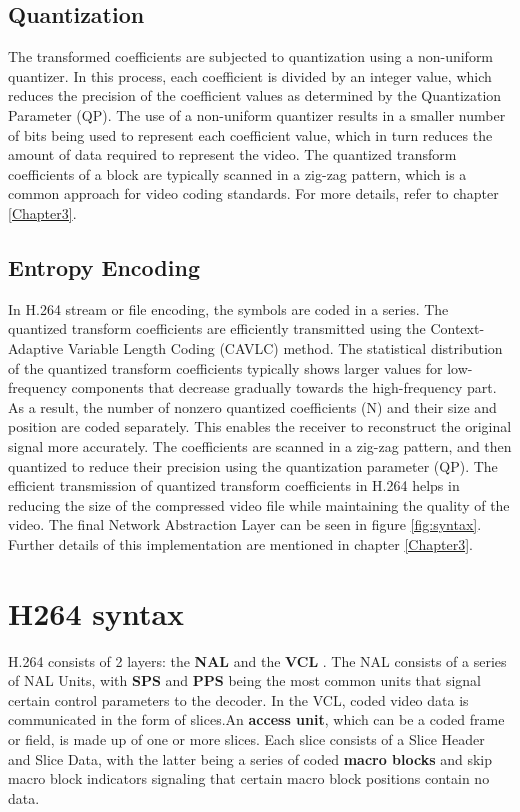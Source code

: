 \subsection{Quantization}
The transformed coefficients are subjected to quantization using a non-uniform quantizer. In this process, each coefficient is divided by an integer value, which reduces the precision of the coefficient values as determined by the Quantization Parameter (QP). The use of a non-uniform quantizer results in a smaller number of bits being used to represent each coefficient value, which in turn reduces the amount of data required to represent the video. The quantized transform coefficients of a block are typically scanned in a zig-zag pattern, which is a common approach for video coding standards. For more details, refer to chapter \ref{Chapter3}.


\subsection{Entropy Encoding}
In H.264 stream or file encoding, the symbols are coded in a series. The quantized transform coefficients are efficiently transmitted using the Context-Adaptive Variable Length Coding (CAVLC) method. The statistical distribution of the quantized transform coefficients typically shows larger values for low-frequency components that decrease gradually towards the high-frequency part. As a result, the number of nonzero quantized coefficients (N) and their size and position are coded separately. This enables the receiver to reconstruct the original signal more accurately. The coefficients are scanned in a zig-zag pattern, and then quantized to reduce their precision using the quantization parameter (QP). The efficient transmission of quantized transform coefficients in H.264 helps in reducing the size of the compressed video file while maintaining the quality of the video. The final Network Abstraction Layer can be seen in figure \ref{fig:syntax}. Further details of this implementation are mentioned in chapter \ref{Chapter3}.


\section{H264 syntax}
H.264 consists of 2 layers: the \textbf{NAL} and the \textbf{VCL} \cite{richardson2010h264}. The NAL consists of a series of NAL Units, with \textbf{SPS} and \textbf{PPS} being the most common units that signal certain control parameters to the decoder. In the VCL, coded video data is communicated in the form of slices.An \textbf{access unit}, which can be a coded frame or field, is made up of one or more slices. Each slice consists of a Slice Header and Slice Data, with the latter being a series of coded \textbf{macro blocks} and skip macro block indicators signaling that certain macro block positions contain no data.

